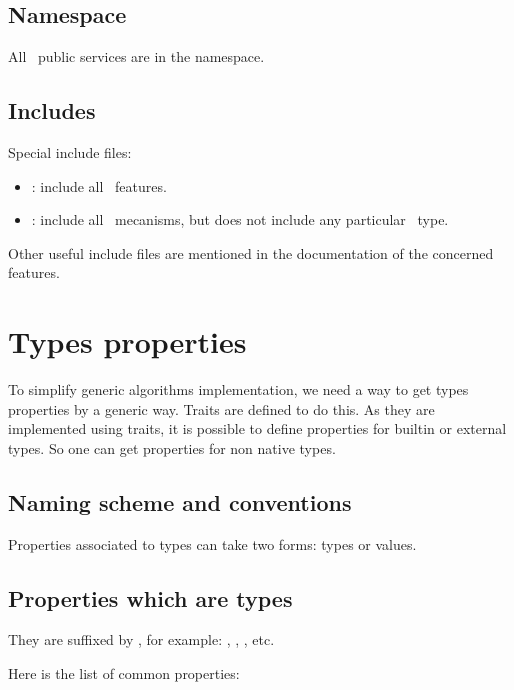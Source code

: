 \subsection{Namespace}

All \integre\ public services are in the  namespace.

\subsection{Includes}

Special include files:

\begin{itemize}
  \item {}: include all \integre\ features.

  \item {}: include all \integre\ mecanisms, but
  does not include any particular \integre\ type.
\end{itemize}

Other useful include files are mentioned in the documentation of the
concerned features.


\section{Types properties}

To simplify generic algorithms implementation, we need a way to get
types properties by a generic way. Traits are defined to do this. As
they are implemented using traits, it is possible to define properties
for builtin or external types. So one can get properties for non
{\integre} native types.

\subsection{Naming scheme and conventions}

Properties associated to types can take two forms: types or values.

\subsection{Properties which are types}

They are suffixed by , for example: ,
, , etc.

Here is the list of common properties:

